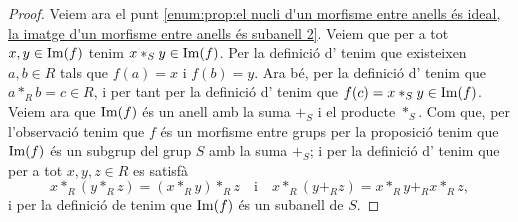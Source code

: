 \documentclass[../Apunts.tex]{subfiles}
\begin{document}
\begin{proposition}
\begin{proof}
			Veiem ara el punt \eqref{enum:prop:el nucli d'un morfisme entre anells és ideal, la imatge d'un morfisme entre anells és subanell 2}. Veiem que per a tot \(x,y\in\operatorname{Im}(f)\) tenim \(x\ast_{S}y\in\operatorname{Im}(f)\). Per la definició d' tenim que existeixen \(a,b\in R\) tals que \(f(a)=x\) i \(f(b)=y\). Ara bé, per la definició d' tenim que \(a\ast_{R}b=c\in R\), i per tant per la definició d' tenim que \(f(c)=x\ast_{S}y\in\operatorname{Im}(f)\). Veiem ara que \(\operatorname{Im}(f)\) és un anell amb la suma \(+_{S}\) i el producte \(\ast_{S}\). Com que, per l'observació  tenim que \(f\) és un morfisme entre grups per la proposició  tenim que \(\operatorname{Im}(f)\) és un subgrup del grup \(S\) amb la suma \(+_{S}\); i per la definició d' tenim que per a tot \(x,y,z\in R\) es satisfà
			\[x\ast_{R}(y\ast_{R}z)=(x\ast_{R}y)\ast_{R}z\quad\text{i}\quad x\ast_{R}(y+_{R}z)=x\ast_{R}y+_{R}x\ast_{R}z,\]
			i per la definició de  tenim que \(\operatorname{Im}(f)\) és un subanell de \(S\).
		\end{proof}
	\end{proposition}
\end{document}
